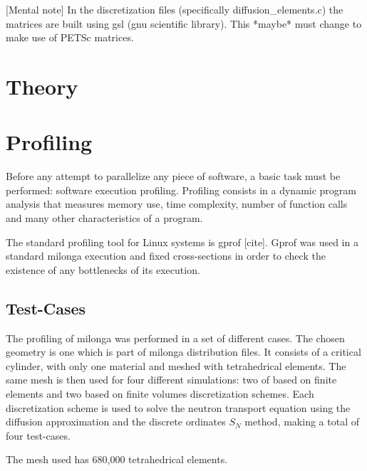 \documentclass{anstrans}
\begin{document}
[Mental note] In the discretization files (specifically diffusion\_elements.c) the matrices are built 
using gsl (gnu scientific library). This *maybe* must change to make use of PETSc matrices.


\section{Theory}

\section{Profiling}
Before any attempt to parallelize any piece of software, a basic task must be performed:
software execution profiling. Profiling consists in a dynamic program analysis
that measures memory use, time complexity, number of function calls and many other characteristics of
a program.

The standard profiling tool for Linux systems is gprof [cite]. Gprof was used in a standard milonga
execution
and fixed cross-sections in order to check
the existence of any bottlenecks of its execution.

\subsection{Test-Cases}

The profiling of milonga was performed in a set of different cases. The chosen geometry is one which is part of
milonga distribution files. It consists of a critical cylinder, with only one material and meshed with
tetrahedrical elements. The same mesh is then used for four different simulations: two of based on
finite elements and two based on finite volumes discretization schemes. Each discretization scheme is used
to solve the neutron transport equation using the diffusion approximation and the discrete ordinates $S_N$ method,
making a total of four test-cases.

The mesh used has 680,000 tetrahedrical elements.

\end{document}
